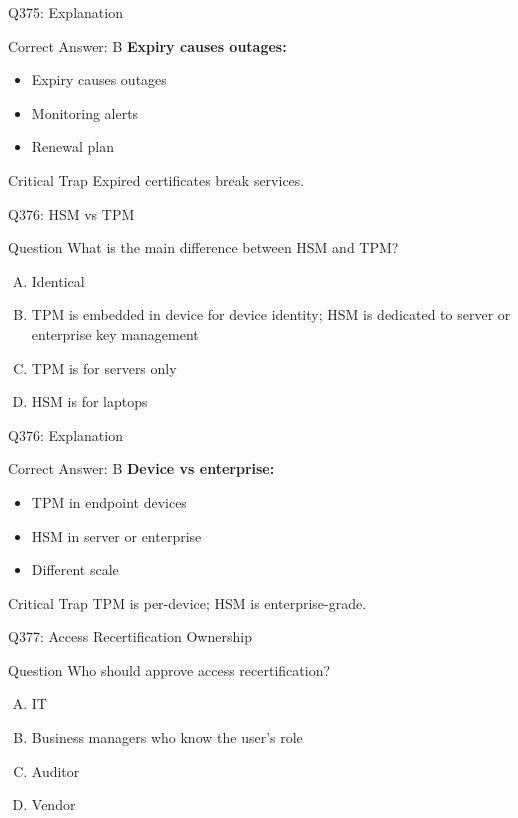 \documentclass{beamer}
\begin{document}
	\begin{frame}{Q375: Explanation}
		\begin{block}{Correct Answer: B}
			\textbf{Expiry causes outages:}
			\begin{itemize}
				\item Expiry causes outages
				\item Monitoring alerts
				\item Renewal plan
			\end{itemize}
		\end{block}
		\begin{alertblock}{Critical Trap}
			Expired certificates break services.
		\end{alertblock}
	\end{frame}
	
	\begin{frame}{Q376: HSM vs TPM}
		\begin{block}{Question}
			What is the main difference between HSM and TPM?
		\end{block}
		\begin{enumerate}[(A)]
			\item Identical
			\item TPM is embedded in device for device identity; HSM is dedicated to server or enterprise key management
			\item TPM is for servers only
			\item HSM is for laptops
		\end{enumerate}
	\end{frame}
	
	\begin{frame}{Q376: Explanation}
		\begin{block}{Correct Answer: B}
			\textbf{Device vs enterprise:}
			\begin{itemize}
				\item TPM in endpoint devices
				\item HSM in server or enterprise
				\item Different scale
			\end{itemize}
		\end{block}
		\begin{alertblock}{Critical Trap}
			TPM is per-device; HSM is enterprise-grade.
		\end{alertblock}
	\end{frame}
	
	\begin{frame}{Q377: Access Recertification Ownership}
		\begin{block}{Question}
			Who should approve access recertification?
		\end{block}
		\begin{enumerate}[(A)]
			\item IT
			\item Business managers who know the user's role
			\item Auditor
			\item Vendor
		\end{enumerate}
	\end{frame}
	
\end{document}
